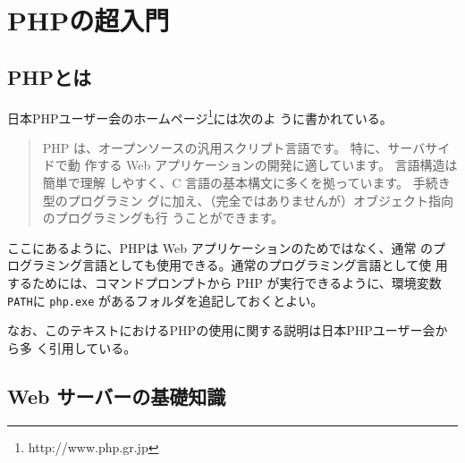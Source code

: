 \chapter{PHPの超入門}
\section{PHPとは}
日本PHPユーザー会のホームページ\footnote{http://www.php.gr.jp}には次のよ
うに書かれている。
\begin{quotation}
PHP は、オープンソースの汎用スクリプト言語です。 特に、サーバサイドで動
 作する Web アプリケーションの開発に適しています。 言語構造は簡単で理解
 しやすく、C 言語の基本構文に多くを拠っています。 手続き型のプログラミン
 グに加え、（完全ではありませんが）オブジェクト指向のプログラミングも行
 うことができます。
\end{quotation}
ここにあるように、PHPは Web アプリケーションのためではなく、通常
のプログラミング言語としても使用できる。通常のプログラミング言語として使
用するためには、コマンドプロンプトから PHP が実行できるように、環境変数
\texttt{PATH}に \texttt{php.exe} があるフォルダを追記しておくとよい。

なお、このテキストにおけるPHPの使用に関する説明は日本PHPユーザー会から多
く引用している。

\section{Web サーバーの基礎知識}
